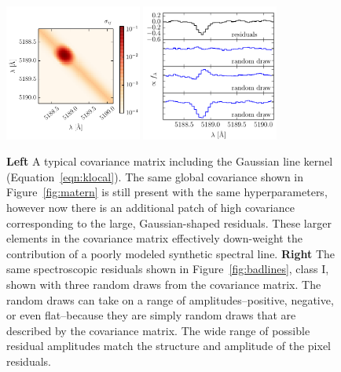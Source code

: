 \documentclass[iop,floatfix]{emulateapj}
\begin{document}
\begin{figure}[!t]
\begin{center}
\includegraphics[width=0.4\textwidth]{figs/gauss_matrix.pdf}
\includegraphics[width=0.4\textwidth]{figs/gauss_draw.pdf}
\caption{\textbf{Left} A typical covariance matrix including the Gaussian line kernel (Equation~\ref{eqn:klocal}). The same global covariance shown in Figure~\ref{fig:matern} is still present with the same hyperparameters, however now there is an additional patch of high covariance corresponding to the large, Gaussian-shaped residuals. These larger elements in the covariance matrix effectively down-weight the contribution of a poorly modeled synthetic spectral line.
\textbf{Right} The same spectroscopic residuals shown in Figure~\ref{fig:badlines}, class I, shown with three random draws from the covariance matrix. The random draws can take on a range of amplitudes--positive, negative, or even flat--because they are simply random draws that are described by the covariance matrix. The wide range of possible residual amplitudes match the structure and amplitude of the pixel residuals.}
\label{fig:region}
\end{center}
\end{figure}
\end{document}
